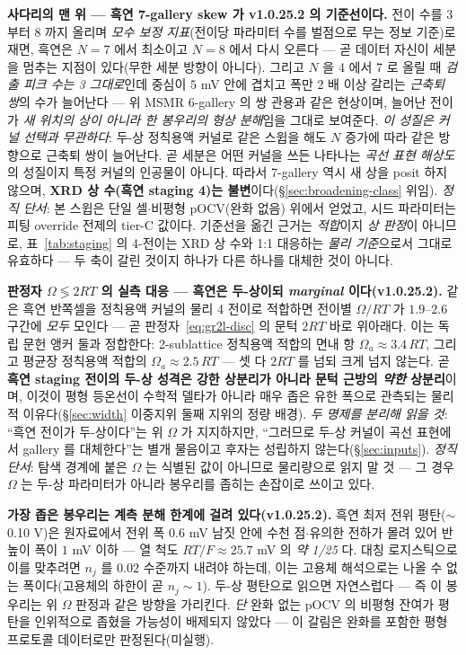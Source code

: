 \textbf{사다리의 맨 위 --- 흑연 7-gallery skew 가 v1.0.25.2 의 기준선이다.} 전이 수를 3 부터 8 까지 올리며
\emph{모수 보정 지표}(전이당 파라미터 수를 벌점으로 무는 정보 기준)로 재면, 흑연은 $N{=}7$ 에서 최소이고
$N{=}8$ 에서 다시 오른다 --- 곧 데이터 자신이 세분을 멈추는 지점이 있다(무한 세분 방향이 아니다).
그리고 $N$ 을 4 에서 7 로 올릴 때 \emph{검출 피크 수는 3 그대로}인데 중심이 $5$ mV 안에 겹치고 폭만
2 배 이상 갈리는 \emph{근축퇴 쌍}의 수가 늘어난다 --- 위 MSMR 6-gallery 의 쌍 관용과 같은 현상이며,
늘어난 전이가 \emph{새 위치의 상이 아니라 한 봉우리의 형상 분해}임을 그대로 보여준다.
\emph{이 성질은 커널 선택과 무관하다}: 두-상 정칙용액 커널로 같은 스윕을 해도 $N$ 증가에 따라 같은 방향으로
근축퇴 쌍이 늘어난다. 곧 세분은 어떤 커널을 쓰든 나타나는 \emph{곡선 표현 해상도}의 성질이지 특정 커널의
인공물이 아니다. 따라서 7-gallery 역시 새 상을 posit 하지 않으며, \textbf{XRD 상 수(흑연 staging 4)는
불변}이다(\S\ref{sec:broadening-class} 위임). \emph{정직 단서}: 본 스윕은 단일 셀$\cdot$비평형
pOCV(완화 없음) 위에서 얻었고, 시드 파라미터는 피팅 override 전제의 tier-C 값이다. 기준선을 옮긴 근거는
\emph{적합}이지 \emph{상 판정}이 아니므로, 표~\ref{tab:staging} 의 4-전이는 XRD 상 수와 1:1 대응하는
\emph{물리 기준}으로서 그대로 유효하다 --- 두 축이 갈린 것이지 하나가 다른 하나를 대체한 것이 아니다.

\textbf{판정자 $\Omega\lessgtr2RT$ 의 실측 대응 --- 흑연은 두-상이되 \emph{marginal} 이다(v1.0.25.2).}
같은 흑연 반쪽셀을 정칙용액 커널의 물리 4 전이로 적합하면 전이별 $\Omega/RT$ 가 $1.9$--$2.6$ 구간에
\emph{모두} 모인다 --- 곧 판정자~\eqref{eq:gr2l-disc} 의 문턱 $2RT$ 바로 위아래다. 이는 독립 문헌 앵커 둘과
정합한다: 2-sublattice 정칙용액 적합의 면내 항 $\Omega_a\!\approx\!3.4\,RT$, 그리고 평균장 정칙용액 적합의
$\Omega_a\!\approx\!2.5\,RT$ --- 셋 다 $2RT$ 를 넘되 크게 넘지 않는다. 곧 \textbf{흑연 staging 전이의 두-상
성격은 강한 상분리가 아니라 문턱 근방의 \emph{약한} 상분리}이며, 이것이 평형 등온선이 수학적 델타가 아니라
매우 좁은 유한 폭으로 관측되는 물리적 이유다(\S\ref{sec:width} 이중지위 둘째 지위의 정량 배경).
\emph{두 명제를 분리해 읽을 것}: ``흑연 전이가 두-상이다''는 위 $\Omega$ 가 지지하지만, ``그러므로 두-상
커널이 곡선 표현에서 gallery 를 대체한다''는 별개 물음이고 후자는 성립하지 않는다(\S\ref{sec:inputs}).
\emph{정직 단서}: 탐색 경계에 붙은 $\Omega$ 는 식별된 값이 아니므로 물리량으로 읽지 말 것 --- 그 경우
$\Omega$ 는 두-상 파라미터가 아니라 봉우리를 좁히는 손잡이로 쓰이고 있다.

\textbf{가장 좁은 봉우리는 계측 분해 한계에 걸려 있다(v1.0.25.2).} 흑연 최저 전위 평탄($\sim$0.10 V)은
원자료에서 전위 폭 $0.6$ mV 남짓 안에 수천 점$\cdot$유의한 전하가 몰려 있어 반높이 폭이 $1$ mV 이하 --- 열
척도 $RT/F\!\approx\!25.7$ mV 의 \emph{약 1/25} 다. 대칭 로지스틱으로 이를 맞추려면 $n_j$ 를 $0.02$ 수준까지
내려야 하는데, 이는 고용체 해석으로는 나올 수 없는 폭이다(고용체의 하한이 곧 $n_j{\sim}1$). 두-상 평탄으로
읽으면 자연스럽다 --- 즉 이 봉우리는 위 $\Omega$ 판정과 같은 방향을 가리킨다. \emph{단} 완화 없는 pOCV 의
비평형 잔여가 평탄을 인위적으로 좁혔을 가능성이 배제되지 않았다 --- 이 갈림은 완화를 포함한 평형 프로토콜
데이터로만 판정된다(미실행).

